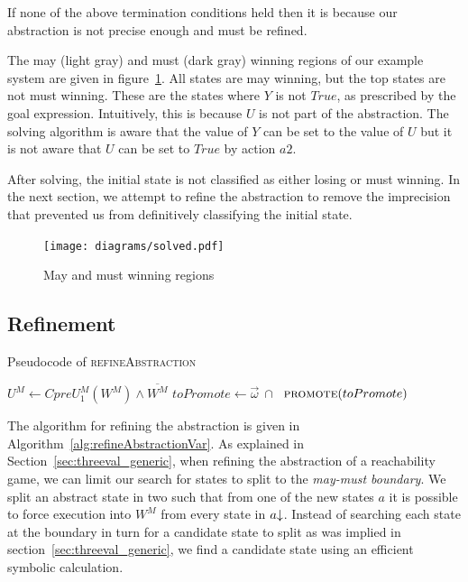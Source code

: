 If none of the above termination conditions held then it is because our abstraction is not precise enough and must be refined.

The may (light gray) and must (dark gray) winning regions of our example system are given in figure~\ref{fig:may_must_win}. All states are may winning, but the top states are not must winning. These are the states where $Y$ is not $True$, as prescribed by the goal expression. Intuitively, this is because $U$ is not part of the abstraction. The solving algorithm is aware that the value of $Y$ can be set to the value of $U$ but it is not aware that $U$ can be set to $True$ by action $a2$.

After solving, the initial state is not classified as either losing or must winning. In the next section, we attempt to refine the abstraction to remove the imprecision that prevented us from definitively classifying the initial state. 

\begin{figure}[t]
\centering
\texttt{[image: diagrams/solved.pdf]}
\caption{May and must winning regions}
\label{fig:may_must_win}
\end{figure}

\subsection{Refinement}

\begin{algorithm}

\caption{Pseudocode of \textsc{refineAbstraction}}
\label{alg:refineAbstractionVar}

\begin{algorithmic}[1]
    \State $U^M \gets CpreU_1^M(W^M) \land \overline{W^M}$
    \State $toPromote \gets \vec{\omega}~\cap~$ \label{a:ra:extract_prime}
    \State $\Call{promote}{toPromote}$ \label{a:ra:promote}
\EndFunction
\end{algorithmic}
\end{algorithm}

The algorithm for refining the abstraction is given in Algorithm~\ref{alg:refineAbstractionVar}. As explained in Section~\ref{sec:threeval_generic}, when refining the abstraction of a reachability game, we can limit our search for states to split to the \emph{may-must boundary}. We split an abstract state in two such that from one of the new states $a$ it is possible to force execution into $W^M$ from every state in $a\mathord{\downarrow}$. Instead of searching each state at the boundary in turn for a candidate state to split as was implied in section~\ref{sec:threeval_generic}, we find a candidate state using an efficient symbolic calculation.

